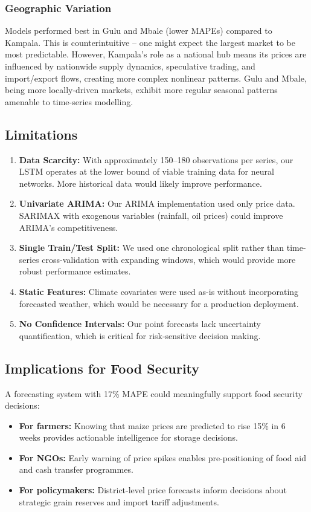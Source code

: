 \documentclass[12pt,a4paper]{article}
\begin{document}
\subsubsection{Geographic Variation}
Models performed best in Gulu and Mbale (lower MAPEs) compared to Kampala. This is counterintuitive -- one might expect the largest market to be most predictable. However, Kampala's role as a national hub means its prices are influenced by nationwide supply dynamics, speculative trading, and import/export flows, creating more complex nonlinear patterns. Gulu and Mbale, being more locally-driven markets, exhibit more regular seasonal patterns amenable to time-series modelling.

\subsection{Limitations}

\begin{enumerate}
    \item \textbf{Data Scarcity:} With approximately 150--180 observations per series, our LSTM operates at the lower bound of viable training data for neural networks. More historical data would likely improve performance.
    
    \item \textbf{Univariate ARIMA:} Our ARIMA implementation used only price data. SARIMAX with exogenous variables (rainfall, oil prices) could improve ARIMA's competitiveness.
    
    \item \textbf{Single Train/Test Split:} We used one chronological split rather than time-series cross-validation with expanding windows, which would provide more robust performance estimates.
    
    \item \textbf{Static Features:} Climate covariates were used as-is without incorporating forecasted weather, which would be necessary for a production deployment.
    
    \item \textbf{No Confidence Intervals:} Our point forecasts lack uncertainty quantification, which is critical for risk-sensitive decision making.
\end{enumerate}

\subsection{Implications for Food Security}
A forecasting system with 17\% MAPE could meaningfully support food security decisions:
\begin{itemize}
    \item \textbf{For farmers:} Knowing that maize prices are predicted to rise 15\% in 6 weeks provides actionable intelligence for storage decisions.
    \item \textbf{For NGOs:} Early warning of price spikes enables pre-positioning of food aid and cash transfer programmes.
    \item \textbf{For policymakers:} District-level price forecasts inform decisions about strategic grain reserves and import tariff adjustments.
\end{itemize}
\end{document}
